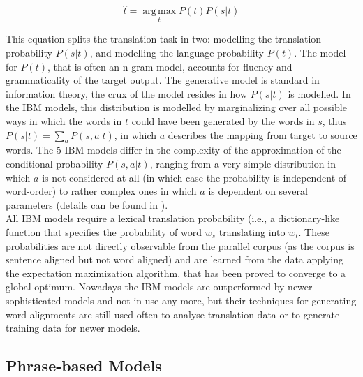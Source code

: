 \documentclass{report}
\theoremstyle{definition}
\theoremstyle{plain}
\begin{document}
\[
\hat{t} = \operatorname*{arg\,max}_t P(t)P(s|t)
\]

This equation splits the translation task in two: modelling the translation probability $P(s|t)$, and modelling the language probability $P(t)$. The model for $P(t)$, that is often an n-gram model, accounts for fluency and grammaticality of the target output. The generative model is standard in information theory, the crux of the model resides in how $P(s|t)$ is modelled. In the IBM models, this distribution is modelled by marginalizing over all possible ways in which the words in $t$ could have been generated by the words in $s$, thus $P(s|t) = \sum_a P(s,a|t)$, in which $a$ describes the mapping from target to source words. The 5 IBM models differ in the complexity of the approximation of the conditional probability $P(s,a|t)$, ranging from a very simple distribution in which $a$ is not considered at all (in which case the probability is independent of word-order) to rather complex ones in which $a$ is dependent on several parameters (details can be found in \cite{brown1993mathematics}).\\
All IBM models require a lexical translation probability (i.e., a dictionary-like function that specifies the probability of word $w_s$ translating into $w_t$. These probabilities are not directly observable from the parallel corpus (as the corpus is sentence aligned but not word aligned) and are learned from the data applying the expectation maximization algorithm, that has been proved to converge to a global optimum. Nowadays the IBM models are outperformed by newer sophisticated models and not in use any more, but their techniques for generating word-alignments are still used often to analyse translation data or to generate training data for newer models.

\subsection{Phrase-based Models}
\end{document}
